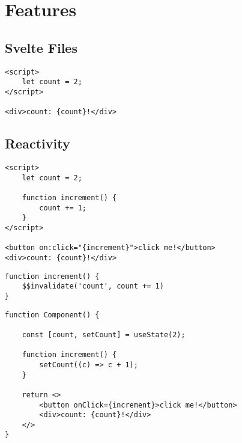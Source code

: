 % 
% 
% 
% 

\section{Features}

\subsection{Svelte Files}

\begin{verbatim}
<script>
    let count = 2;
</script>

<div>count: {count}!</div>
\end{verbatim}

\subsection{Reactivity}

\begin{verbatim}
<script>
    let count = 2;

    function increment() {
        count += 1;
    }
</script>

<button on:click="{increment}">click me!</button>
<div>count: {count}!</div>
\end{verbatim}

\begin{verbatim}
function increment() {
    $$invalidate('count', count += 1)
}
\end{verbatim}

\begin{verbatim}
function Component() {

    const [count, setCount] = useState(2);

    function increment() {
        setCount((c) => c + 1);
    }

    return <>
        <button onClick={increment}>click me!</button>
        <div>count: {count}!</div>
    </>
}
\end{verbatim}


